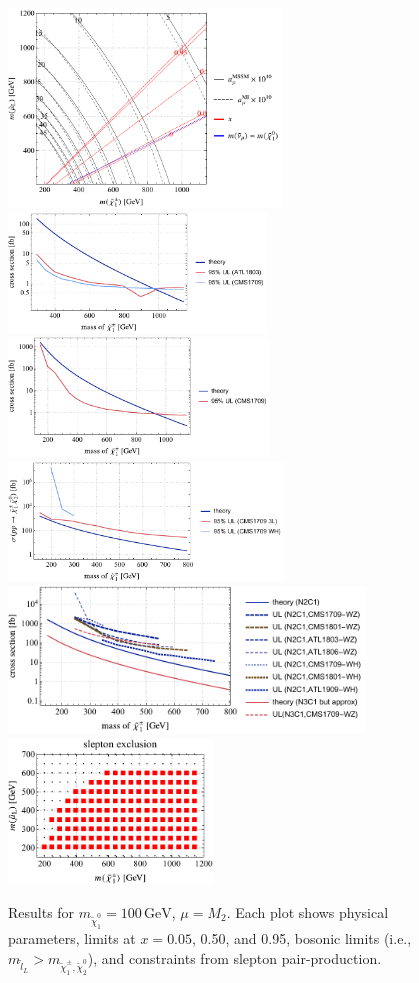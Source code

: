 \documentclass[a4paper,10pt,captions=tableheading,DIV=14]{scrartcl}
\numberwithin{equation}{section}
\newcommand\unit[1]{\,\mathrm{#1}\xspace}
\newcommand\GeV{\unit{GeV}}
\newcommand\neut  [1][\relax]{{\tilde\chi^0_{#1}}}
\newcommand\charPM[1][\relax]{{\tilde\chi^\pm_{#1}}}
\begin{document}
\begin{figure}[h!]\centering
  \includegraphics[height=150pt]{../plots/plot_spectrum_tab1_physplot.pdf}
  \includegraphics[height=90pt]{../plots/plot_tab1m100x050_limit.pdf}
  \includegraphics[height=90pt]{../plots/plot_tab1m100x005_limit.pdf}
  \includegraphics[height=90pt]{../plots/plot_tab1m100x095_limit21.pdf}
  \includegraphics[height=110pt]{../plots/plot_tab1m100boson_limit.pdf}
  \includegraphics[height=110pt]{../plots/plot_tab1m100slep_limit.pdf}
\caption{Results for $m_{\neut[1]}=100\GeV$, $\mu=M_2$. Each plot shows physical parameters,  limits at $x=0.05$, 0.50, and 0.95, bosonic limits (i.e., $m_{\tilde l_L}>m_{\charPM[1],\neut[2]}$), and constraints from slepton pair-production.}
\end{figure}
\end{document}

